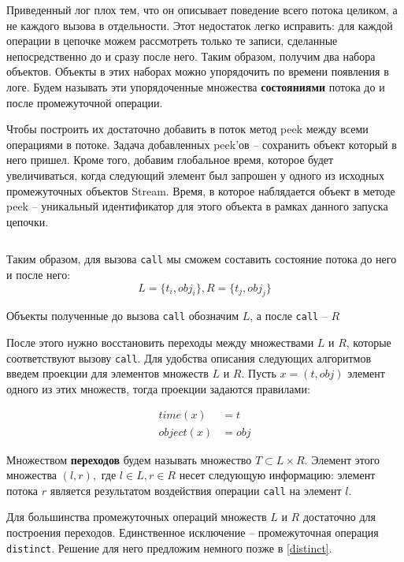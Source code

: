 Приведенный лог плох тем, что он описывает поведение всего потока целиком, а не каждого вызова в отдельности. Этот недостаток легко исправить: для каждой операции в цепочке можем рассмотреть только те записи, сделанные непосредственно до и сразу после него. Таким образом, получим два набора объектов. Объекты в этих наборах можно упорядочить по времени появления в логе. Будем называть эти упорядоченные множества \textbf{состояниями} потока до и после промежуточной операции. 

Чтобы построить их достаточно добавить в поток метод peek между всеми операциями в потоке. Задача добавленных peek'ов -- сохранить объект который в него пришел. Кроме того, добавим глобальное время, которое будет увеличиваться, когда следующий элемент был запрошен у одного из исходных промежуточных объектов Stream. Время, в которое наблядается объект в методе peek -- уникальный идентификатор для этого объекта в рамках данного запуска цепочки. 

\inputminted{java}{chapter2/code/LocalChainModification.java}

Таким образом, для вызова \texttt{call} мы сможем составить состояние потока до него и после него:
\begin{equation*}
	L = \{t_i, obj_i\}, R = \{t_j, obj_j\}
\end{equation*}

Объекты полученные до вызова \texttt{call} обозначим $L$, а после \texttt{call} -- $R$

После этого нужно восстановить переходы между множествами $L$ и $R$, которые соответствуют вызову \texttt{call}. Для удобства описания следующих алгоритмов введем проекции для элементов множеств $L$ и $R$. Пусть $x = (t, obj)$ элемент одного из этих множеств, тогда проекции задаются правилами:

\begin{align*}
	time(x) &= t \\
	object(x) &= obj
\end{align*}

Множеством \textbf{переходов} будем называть множество $T \subset L \times R$. Элемент этого множества $(l, r), $ где $l \in L, r \in R$ несет следующую информацию: элемент потока $r$ является результатом воздействия операции \texttt{call} на элемент $l$.

Для большинства промежуточных операций множеств $L$ и $R$ достаточно для построения переходов. Единственное исключение -- промежуточная операция \texttt{distinct}. Решение для него предложим немного позже в \ref{distinct}.

